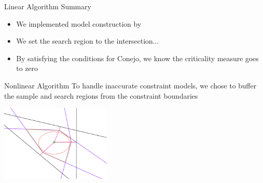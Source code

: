 \documentclass{beamer}
\begin{document}
\begin{frame}{Linear Algorithm Summary}
	\begin{itemize}
		\item We implemented model construction by 
		\item We set the search region to the intersection...
		\item By satisfying the conditions for Conejo, we know the criticality measure goes to zero
	\end{itemize}
\end{frame}

% 	

% 


\begin{frame}{Nonlinear Algorithm}
	To handle inaccurate constraint models, 
	we chose to buffer the sample and search regions from the constraint boundaries
	
	\begin{center}
		\includegraphics[width=200px]{images/completed_2.png}
	\end{center}
	
\end{frame}
\end{document}
